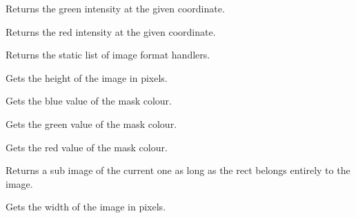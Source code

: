 
Returns the green intensity at the given coordinate.

\label{wximagegetred}


Returns the red intensity at the given coordinate.



Returns the static list of image format handlers.



\label{wximagegetheight}


Gets the height of the image in pixels.

\label{wximagegetmaskblue}


Gets the blue value of the mask colour.

\label{wximagegetmaskgreen}


Gets the green value of the mask colour.

\label{wximagegetmaskred}


Gets the red value of the mask colour.

\label{wximagegetsubimage}


Returns a sub image of the current one as long as the rect belongs entirely to 
the image.

\label{wximagegetwidth}


Gets the width of the image in pixels.


